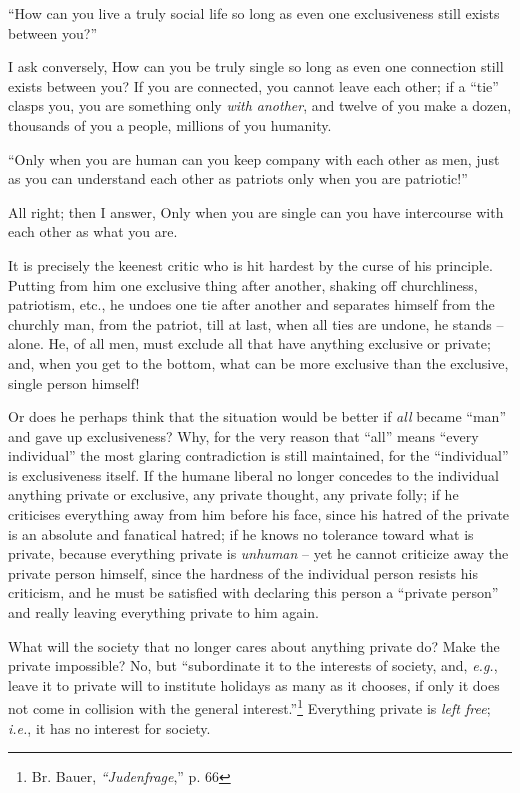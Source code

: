 ``How can you live a truly social life so long as even one exclusiveness 
still exists between you?''

I ask conversely, How can you be truly single so long as even one connection 
still exists between you? If you are connected, you cannot leave each other; 
if a ``tie'' clasps you, you are something only \textit{with another}, and 
twelve of you make a dozen, thousands of you a people, millions of you 
humanity.

``Only when you are human can you keep company with each other as men, just 
as you can understand each other as patriots only when you are patriotic!''

All right; then I answer, Only when you are single can you have intercourse 
with each other as what you are.

It is precisely the keenest critic who is hit hardest by the curse of his 
principle. Putting from him one exclusive thing after another, shaking off 
churchliness, patriotism, etc., he undoes one tie after another and separates 
himself from the churchly man, from the patriot, till at last, when all ties 
are undone, he stands -- alone. He, of all men, must exclude all that have 
anything exclusive or private; and, when you get to the bottom, what can be 
more exclusive than the exclusive, single person himself!

Or does he perhaps think that the situation would be better if \textit{all} 
became ``man'' and gave up exclusiveness? Why, for the very reason that 
``all'' means ``every individual'' the most glaring contradiction is still 
maintained, for the ``individual'' is exclusiveness itself. If the humane 
liberal no longer concedes to the individual anything private or exclusive, 
any private thought, any private folly; if he criticises everything away from 
him before his face, since his hatred of the private is an absolute and 
fanatical hatred; if he knows no tolerance toward what is private, because 
everything private is \textit{unhuman} -- yet he cannot criticize away the 
private person himself, since the hardness of the individual person resists 
his criticism, and he must be satisfied with declaring this person a 
``private person'' and really leaving everything private to him again.

What will the society that no longer cares about anything private do? Make the 
private impossible? No, but ``subordinate it to the interests of society, 
and, \textit{e.g.}, leave it to private will to institute holidays as many as 
it chooses, if only it does not come in collision with the general 
interest.''\footnote{Br. Bauer, \textit{``Judenfrage},'' p. 66} Everything 
private is \textit{left free}; \textit{i.e.}, it has no interest for society.

